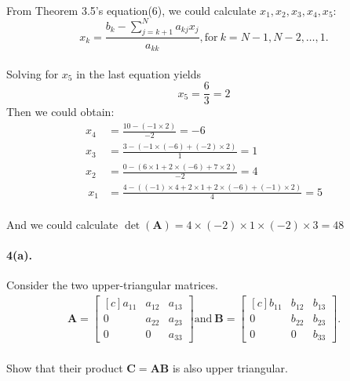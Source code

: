 \documentclass{article}  %
\begin{document}
        \paragraph{}From Theorem 3.5's equation(6), we could calculate $x_1, x_2, x_3, x_4, x_5$:
        $$x_k = \frac{b_k - \sum_{j = k + 1}^{N}a_{kj}x_j }{a_{kk}}, \mathrm{for} \ k = N - 1, N - 2, \dots , 1.$$
        \paragraph{}Solving for $x_5$ in the last equation yields
        $$x_5 = \frac{6}{3} = 2$$
        Then we could obtain:
        \begin{align*}
        x_4 &= \frac{10 - (-1 \times 2)}{-2} = -6 \\
        x_3 &= \frac{3 - (-1 \times (-6) + (-2) \times 2)}{1} = 1 \\
        x_2 &= \frac{0 - (6 \times 1 + 2 \times (-6) + 7 \times 2)}{-2} = 4 \\\
        x_1 &= \frac{4 - ((-1) \times 4 + 2 \times 1 + 2 \times (-6) + (-1) \times 2)}{4} = 5
        \end{align*}
        \paragraph{}And we could calculate $\det(\bm{A}) = 4 \times (-2) \times 1 \times (-2) \times 3 = 48$
        \paragraph{4(a).}Consider the two upper-triangular matrices.
        \begin{align*}
            \bm{A=} \begin{bmatrix*}[c]
                a_{11} & a_{12} & a_{13} \\
                0 & a_{22} & a_{23} \\
                0 & 0 & a_{33}
            \end{bmatrix*} 
            \mathrm{and} \ 
            \bm{B=}  \begin{bmatrix*}[c]
                b_{11} & b_{12} & b_{13} \\
                0 & b_{22} & b_{23} \\
                0 & 0 & b_{33}
            \end{bmatrix*}.
        \end{align*}
        \paragraph{}Show that their product $\bm{C = AB}$ is also upper triangular.
\end{document}
